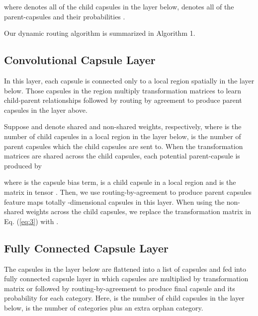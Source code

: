 \documentclass[11pt]{article}
\begin{document}
where  denotes all of the child capsules in the layer below,  denotes all of the parent-capsules and their probabilities .

Our dynamic routing algorithm is summarized in Algorithm 1.









\subsection{Convolutional Capsule Layer}
In this layer, each capsule is connected only to a local region  spatially in the layer below. Those capsules in the region multiply transformation matrices to learn child-parent relationships followed by routing by agreement to produce parent capsules in the layer above. 




Suppose  and  denote shared and non-shared weights, respectively, where  is the number of child capsules in a local region in the layer below,  is the number of parent capsules which the child capsules are sent to. When the transformation matrices are shared across the child capsules, each potential parent-capsule  is produced by

where  is the capsule bias term,  is a child capsule in a local region  and  is the  matrix in tensor . Then, we use routing-by-agreement to produce parent capsules feature maps totally  -dimensional capsules in this layer.
When using the non-shared weights across the child capsules, we replace the transformation matrix  in Eq. (\ref{eq:3}) with .




















\subsection{Fully Connected Capsule Layer}
The capsules in the layer below are flattened into a list of capsules and fed into fully connected capsule layer in which capsules are multiplied by transformation matrix  or  followed by routing-by-agreement to produce final capsule  and its probability  for each category. Here,  is the number of child capsules in the layer below,  is the number of categories plus an extra orphan category.
\end{document}
